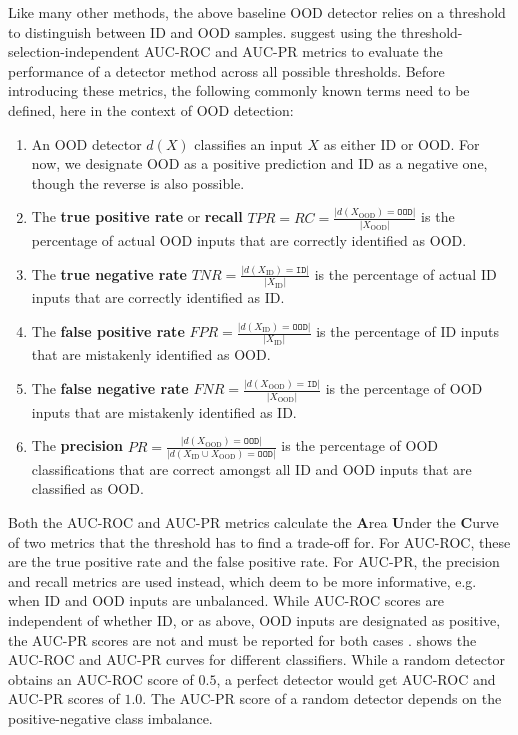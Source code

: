 \newpar Like many other methods, the above baseline OOD detector relies on a threshold to distinguish between ID and OOD samples. \citeauthor{ood-baseline-2016} suggest using the threshold-selection-independent AUC-ROC and AUC-PR metrics to evaluate the performance of a detector method across all possible thresholds. Before introducing these metrics, the following commonly known terms need to be defined, here in the context of OOD detection:
\begin{enumerate}
    \item An OOD detector $d(X)$ classifies an input $X$ as either ID or OOD. For now, we designate OOD as a positive prediction and ID as a negative one, though the reverse is also possible.
    \item The \textbf{true positive rate} or \textbf{recall} $TPR = RC = \frac{|d(X_{\text{OOD}}) = \texttt{OOD}|}{|X_{\text{OOD}}|}$ is the percentage of actual OOD inputs that are correctly identified as OOD.
    \item The \textbf{true negative rate} $TNR = \frac{|d(X_{\text{ID}}) = \texttt{ID}|}{|X_{\text{ID}}|}$ is the percentage of actual ID inputs that are correctly identified as ID.
    \item The \textbf{false positive rate} $FPR = \frac{|d(X_{\text{ID}}) = \texttt{OOD}|}{|X_{\text{ID}}|}$ is the percentage of ID inputs that are mistakenly identified as OOD.
    \item The \textbf{false negative rate} $FNR = \frac{|d(X_{\text{OOD}}) = \texttt{ID}|}{|X_{\text{OOD}}|}$ is the percentage of OOD inputs that are mistakenly identified as ID.
    \item The \textbf{precision} $PR = \frac{|d(X_{\text{OOD}}) = \texttt{OOD}|}{|d(X_{\text{ID}} \cup X_{\text{OOD}}) = \texttt{OOD}|}$ is the percentage of OOD classifications that are correct amongst all ID and OOD inputs that are classified as OOD.
\end{enumerate}
Both the AUC-ROC and AUC-PR metrics calculate the \textbf{A}rea \textbf{U}nder the \textbf{C}urve of two metrics that the threshold has to find a trade-off for. For AUC-ROC, these are the true positive rate and the false positive rate. For AUC-PR, the precision and recall metrics are used instead, which \textcite{aucpr-informative-1999} deem to be more informative, e.g. when ID and OOD inputs are unbalanced. While AUC-ROC scores are independent of whether ID, or as above, OOD inputs are designated as positive, the AUC-PR scores are not and must be reported for both cases \cite{ood-baseline-2016}.  shows the AUC-ROC and AUC-PR curves for different classifiers. While a random detector obtains an AUC-ROC score of $0.5$, a perfect detector would get AUC-ROC and AUC-PR scores of $1.0$. The AUC-PR score of a random detector depends on the positive-negative class imbalance.


